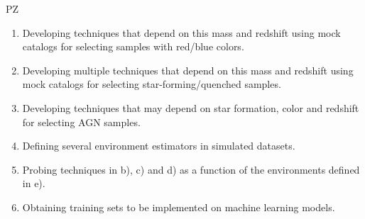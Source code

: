 \begin{tasklist}{PZ}
\begin{task}
{\begin{enumerate}
\item Developing techniques that depend on this mass and redshift using mock catalogs for selecting samples with red/blue colors.
\item Developing multiple techniques that depend on this mass and redshift using mock catalogs for selecting star-forming/quenched samples. 
\item Developing techniques that may depend on star formation, color and redshift for selecting AGN samples.
\item Defining several environment estimators in simulated datasets.
\item Probing techniques in b), c) and d) as a function of the environments defined in e).
\item Obtaining training sets to be implemented on machine learning models.
\end{enumerate}
}
\end{task}


\end{tasklist}
